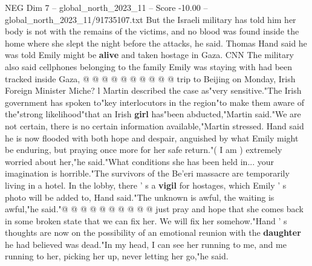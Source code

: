 \begin{textsample}{NEG Dim 7 – global\_north\_2023\_11 – Score -10.00 – global\_north\_2023\_11/91735107.txt}
But the Israeli military has told him her body is not with the remains of the victims, and no blood was found inside the home where she slept the night before the attacks, he said.
Thomas Hand said he was told Emily might be \textbf{alive} and taken hostage in Gaza.
CNN The military also said cellphones belonging to the family Emily was staying with had been tracked inside Gaza, @ @ @ @ @ @ @ @ @ @ trip to Beijing on Monday, Irish Foreign Minister Miche? l Martin described the case as"very sensitive."The Irish government has spoken to"key interlocutors in the region"to make them aware of the"strong likelihood"that an Irish \textbf{girl} has"been abducted,"Martin said."We are not certain, there is no certain information available,"Martin stressed.
Hand said he is now flooded with both hope and despair, anguished by what Emily might be enduring, but praying once more for her safe return."( I am ) extremely worried about her,"he said."What conditions she has been held in... your imagination is horrible."The survivors of the Be'eri massacre are temporarily living in a hotel.
In the lobby, there ' s a \textbf{vigil} for hostages, which Emily ' s photo will be added to, Hand said."The unknown is awful, the waiting is awful,"he said."@ @ @ @ @ @ @ @ @ @ just pray and hope that she comes back in some broken state that we can fix her.
We will fix her somehow."Hand ' s thoughts are now on the possibility of an emotional reunion with the \textbf{daughter} he had believed was dead."In my head, I can see her running to me, and me running to her, picking her up, never letting her go,"he said.

\end{textsample}
